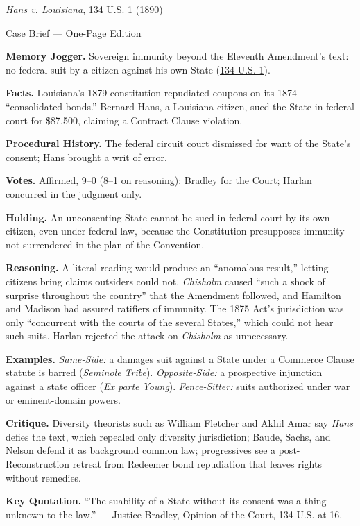 \documentclass[12pt]{article}
\begin{document}
\begin{center}
{\Large \textit{Hans v. Louisiana}, 134 U.S. 1 (1890)\par}
\vspace{0.3em}
{\normalsize Case Brief --- One-Page Edition\par}
\end{center}

\textbf{Memory Jogger.} Sovereign immunity beyond the Eleventh Amendment's text: no federal suit by a citizen against his own State (\href{https://supreme.justia.com/cases/federal/us/134/1/}{134 U.S. 1}).

\textbf{Facts.} Louisiana's 1879 constitution repudiated coupons on its 1874 ``consolidated bonds.'' Bernard Hans, a Louisiana citizen, sued the State in federal court for \$87,500, claiming a Contract Clause violation.

\textbf{Procedural History.} The federal circuit court dismissed for want of the State's consent; Hans brought a writ of error.

\textbf{Votes.} Affirmed, 9--0 (8--1 on reasoning): Bradley for the Court; Harlan concurred in the judgment only.

\textbf{Holding.} An unconsenting State cannot be sued in federal court by its own citizen, even under federal law, because the Constitution presupposes immunity not surrendered in the plan of the Convention.

\textbf{Reasoning.} A literal reading would produce an ``anomalous result,'' letting citizens bring claims outsiders could not. \textit{Chisholm} caused ``such a shock of surprise throughout the country'' that the Amendment followed, and Hamilton and Madison had assured ratifiers of immunity. The 1875 Act's jurisdiction was only ``concurrent with the courts of the several States,'' which could not hear such suits. Harlan rejected the attack on \textit{Chisholm} as unnecessary.

\textbf{Examples.} \emph{Same-Side:} a damages suit against a State under a Commerce Clause statute is barred (\textit{Seminole Tribe}). \emph{Opposite-Side:} a prospective injunction against a state officer (\textit{Ex parte Young}). \emph{Fence-Sitter:} suits authorized under war or eminent-domain powers.

\textbf{Critique.} Diversity theorists such as William Fletcher and Akhil Amar say \textit{Hans} defies the text, which repealed only diversity jurisdiction; Baude, Sachs, and Nelson defend it as background common law; progressives see a post-Reconstruction retreat from Redeemer bond repudiation that leaves rights without remedies.

\textbf{Key Quotation.} ``The suability of a State without its consent was a thing unknown to the law.'' --- Justice Bradley, Opinion of the Court, 134 U.S. at 16.
\end{document}
